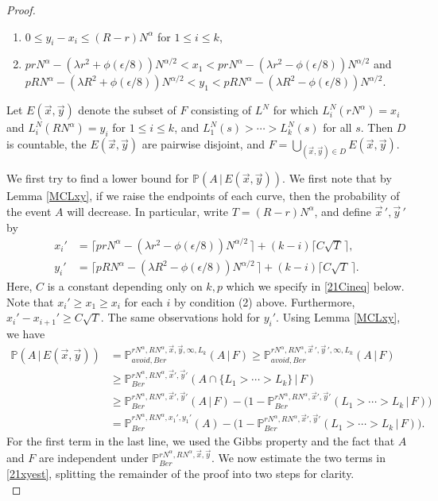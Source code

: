 \begin{proof}
\begin{enumerate}[label=(\arabic*)]
			\item $0\leq y_i - x_i \leq (R-r)N^\alpha$ for $1\leq i\leq k$,
			
			\item $prN^\alpha - (\lambda r^2+\phi(\epsilon/8))N^{\alpha/2} < x_1 <  prN^\alpha - (\lambda r^2-\phi(\epsilon/8))N^{\alpha/2}$ and $pRN^\alpha - (\lambda R^2+\phi(\epsilon/8))N^{\alpha/2} < y_1 <  pRN^\alpha - (\lambda R^2-\phi(\epsilon/8))N^{\alpha/2}$.
			
		\end{enumerate}
		
		Let $E(\vec{x},\vec{y})$ denote the subset of $F$ consisting of $L^N$ for which $L_i^N(rN^\alpha) = x_i$ and $L_i^N(RN^\alpha)=y_i$ for $1\leq i\leq k$, and $L_1^N(s) > \cdots > L_k^N(s)$ for all $s$. Then $D$ is countable, the $E(\vec{x},\vec{y})$ are pairwise disjoint, and $F = \bigcup_{(\vec{x},\vec{y})\in D} E(\vec{x},\vec{y})$.
		
		We first try to find a lower bound for $\mathbb{P}(A\,|\,E(\vec{x},\vec{y}))$. We first note that by Lemma \ref{MCLxy}, if we raise the endpoints of each curve, then the probability of the event $A$ will decrease. In particular, write $T = (R-r)N^\alpha$, and define $\vec{x}\,',\vec{y}\,'$ by
		\begin{align*}
		x_i' &= \lceil prN^\alpha - (\lambda r^2 - \phi(\epsilon/8))N^{\alpha/2}\,\rceil + (k-i)\lceil C\sqrt{T}\,\rceil,\\
		y_i' &= \lceil pRN^\alpha - (\lambda R^2 - \phi(\epsilon/8))N^{\alpha/2}\,\rceil + (k-i)\lceil C\sqrt{T}\,\rceil.
		\end{align*}
		Here, $C$ is a constant depending only on $k,p$ which we specify in \eqref{21Cineq} below. Note that $x_i' \geq x_1 \geq x_i$ for each $i$ by condition (2) above. Furthermore, $x_i' - x_{i+1}' \geq C\sqrt{T}$. The same observations hold for $y_i'$. Using Lemma \ref{MCLxy}, we have
		\begin{align}
		\mathbb{P}(A\,|\,E(\vec{x},\vec{y})) &= \mathbb{P}^{rN^\alpha, RN^\alpha,\vec{x},\vec{y},\infty,L_k}_{avoid,Ber} (A\,|\,F) \geq \mathbb{P}^{rN^\alpha, RN^\alpha,\vec{x}\,',\vec{y}\,',\infty,L_k}_{avoid,Ber} (A\,|\,F) \nonumber \\
		&\geq \mathbb{P}^{rN^\alpha, RN^\alpha,\vec{x}',\vec{y}'}_{Ber} (A\cap\{L_1 > \cdots > L_k\}\,|\,F) \nonumber \\
		&\geq \mathbb{P}^{rN^\alpha, RN^\alpha,\vec{x}',\vec{y}'}_{Ber} (A\,|\,F) - \big( 1 - \mathbb{P}^{rN^\alpha, RN^\alpha,\vec{x}',\vec{y}'}_{Ber} (L_1 > \cdots > L_k\,|\,F)\big) \nonumber\\
		&= \mathbb{P}^{rN^\alpha, RN^\alpha,x_1',y_1'}_{Ber} (A) - \big( 1 - \mathbb{P}^{rN^\alpha, RN^\alpha,\vec{x}',\vec{y}'}_{Ber} (L_1 > \cdots > L_k\,|\,F)\big). \label{21xyest}
		\end{align}
		For the first term in the last line, we used the Gibbs property and the fact that $A$ and $F$ are independent under $\mathbb{P}^{rN^\alpha, RN^\alpha,\vec{x},\vec{y}}_{Ber}$. We now estimate the two terms in \eqref{21xyest}, splitting the remainder of the proof into two steps for clarity.\\
		

\end{proof}
